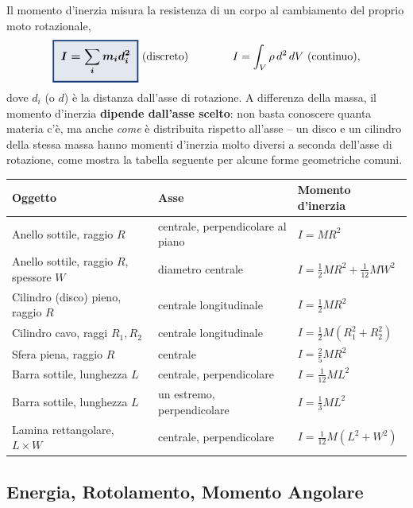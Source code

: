 \documentclass[a4paper,11pt]{article}
\newcommand{\keyeq}[1]{{\setlength{\fboxsep}{6pt}\setlength{\fboxrule}{1.3pt}\fcolorbox{chapblue}{chapblue!12}{\boldmath$\displaystyle #1$}}}
\begin{document}
Il momento d'inerzia misura la resistenza di un corpo al cambiamento del proprio moto rotazionale,
\[
\keyeq{I = \sum_i m_id_i^2} \ \text{(discreto)} \qquad\qquad I = \int_V \rho\,d^2\,dV \ \text{(continuo)},
\]
dove $d_i$ (o $d$) è la distanza dall'asse di rotazione. A differenza della massa, il momento d'inerzia \textbf{dipende dall'asse scelto}: non basta conoscere quanta materia c'è, ma anche \emph{come} è distribuita rispetto all'asse -- un disco e un cilindro della stessa massa hanno momenti d'inerzia molto diversi a seconda dell'asse di rotazione, come mostra la tabella seguente per alcune forme geometriche comuni.

\begin{center}
\small
\begin{tabular}{lll}
\toprule
\textbf{Oggetto} & \textbf{Asse} & \textbf{Momento d'inerzia} \\
\midrule
Anello sottile, raggio $R$ & centrale, perpendicolare al piano & $I=MR^2$ \\
Anello sottile, raggio $R$, spessore $W$ & diametro centrale & $I=\frac12MR^2+\frac{1}{12}MW^2$ \\
Cilindro (disco) pieno, raggio $R$ & centrale longitudinale & $I=\frac12MR^2$ \\
Cilindro cavo, raggi $R_1,R_2$ & centrale longitudinale & $I=\frac12M(R_1^2+R_2^2)$ \\
Sfera piena, raggio $R$ & centrale & $I=\frac25MR^2$ \\
Barra sottile, lunghezza $L$ & centrale, perpendicolare & $I=\frac{1}{12}ML^2$ \\
Barra sottile, lunghezza $L$ & un estremo, perpendicolare & $I=\frac13ML^2$ \\
Lamina rettangolare, $L\times W$ & centrale, perpendicolare & $I=\frac{1}{12}M(L^2+W^2)$ \\
\bottomrule
\end{tabular}
\end{center}

\subsection{Energia, Rotolamento, Momento Angolare}
\end{document}
